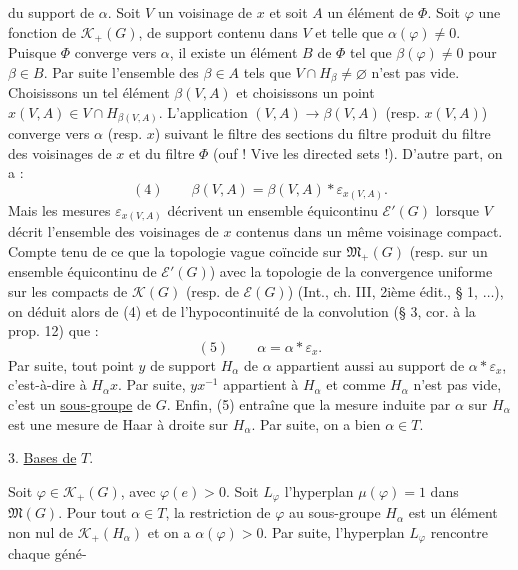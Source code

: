 du support de $\alpha$. Soit $V$ un voisinage de $x$ et soit $A$ un élément de $\Phi$. Soit $\varphi$ une fonction de $\mathcal K_+(G)$, de support contenu dans $V$ et telle que $\alpha(\varphi)\ne 0$. Puisque $\Phi$ converge vers $\alpha$, il existe un élément $B$ de $\Phi$ tel que $\beta(\varphi)\ne 0$ pour $\beta\in B$. Par suite l'ensemble des $\beta\in A$ tels que $V\cap H_\beta\ne\varnothing$ n'est pas vide. Choisissons un tel élément $\beta(V,A)$ et choisissons un point $x(V,A)\in V\cap H_{\beta(V,A)}$. L'application $(V,A)\longrightarrow\beta(V,A)$ (resp. $x(V,A)$) converge vers $\alpha$ (resp. $x$) suivant le filtre des sections du filtre produit du filtre des voisinages de $x$ et du filtre $\Phi$ (ouf ! Vive les directed sets !). D'autre part, on a :
\[
(4)\qquad\beta(V,A)=\beta(V,A)*\varepsilon_{x(V,A)}.
\]
Mais les mesures $\varepsilon_{x(V,A)}$ décrivent un ensemble équicontinu $\mathcal E'(G)$ lorsque $V$ décrit l'ensemble des voisinages de $x$ contenus dans un même voisinage compact. Compte tenu de ce que la topologie vague coïncide sur $\mathfrak M_+(G)$ (resp. sur un ensemble équicontinu de $\mathcal E'(G)$) avec la topologie de la convergence uniforme sur les compacts de $\mathcal K(G)$ (resp. de $\mathcal E(G)$) (Int., ch. III, 2ième édit., § 1, $\ldots$), on déduit alors de (4) et de l'hypocontinuité de la convolution (§ 3, cor. à la prop. 12) que :
\[
(5)\qquad\alpha=\alpha*\varepsilon_x.
\]
Par suite, tout point $y$ de support $H_\alpha$ de $\alpha$ appartient aussi au support de $\alpha*\varepsilon_x$, c'est-à-dire à $H_\alpha x$. Par suite, $yx^{-1}$ appartient à $H_\alpha$ et comme $H_\alpha$ n'est pas vide, c'est un \uline{sous-groupe} de $G$. Enfin, (5) entraîne que la mesure induite par $\alpha$ sur $H_\alpha$ est une mesure de Haar à droite sur $H_\alpha$. Par suite, on a bien $\alpha\in T$.

3. \uline{Bases de} $T$.

Soit $\varphi\in\mathcal K_+(G)$, avec $\varphi(e)>0$. Soit $L_\varphi$ l'hyperplan $\mu(\varphi)=1$ dans $\mathfrak M(G)$. Pour tout $\alpha\in T$, la restriction de $\varphi$ au sous-groupe $H_\alpha$ est un élément non nul de $\mathcal K_+(H_\alpha)$ et on a $\alpha(\varphi)>0$. Par suite, l'hyperplan $L_\varphi$ rencontre chaque géné-
